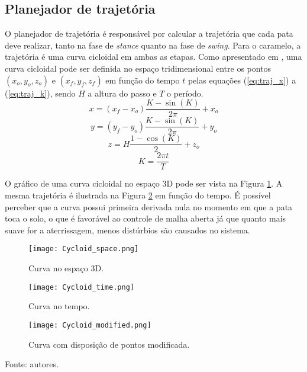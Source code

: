 \documentclass[../main.tex]{subfiles}
\begin{document}
\subsection{Planejador de trajetória}

O planejador de trajetória é responsável por calcular a trajetória que cada pata deve realizar, tanto na fase de \textit{stance} quanto na fase de \textit{swing}. Para o caramelo, a trajetória é uma curva cicloidal em ambas as etapas. Como apresentado em \cite{Shi2021}, uma curva cicloidal pode ser definida no espaço tridimensional entre os pontos $(x_o, y_o, z_o)$ e $(x_f, y_f, z_f)$ em função do tempo $t$ pelas equações (\ref{eq:traj_x}) a (\ref{eq:traj_k}), sendo $H$ a altura do passo e $T$ o período.
\begin{equation}
  x = (x_f - x_o) \frac{K - \sin{(K)}}{2 \pi} + x_o
  \label{eq:traj_x}
\end{equation}
\begin{equation}
  y = (y_f - y_o) \frac{K - \sin{(K)}}{2 \pi} + y_o
  \label{eq:traj_y}
\end{equation}
\begin{equation}
  z = H \frac{1 - \cos{(K)}}{2} + z_o
  \label{eq:traj_z}
\end{equation}
\begin{equation}
  K = \frac{2 \pi t}{T}
  \label{eq:traj_k}
\end{equation}

O gráfico de uma curva cicloidal no espaço 3D pode ser vista na Figura \ref{fig:traj_space}. A mesma trajetória é ilustrada na Figura \ref{fig:traj_time} em função do tempo. É possível perceber que a curva possui primeira derivada nula no momento em que a pata toca o solo, o que é favorável ao controle de malha aberta já que quanto mais suave for a aterrissagem, menos distúrbios são causados no sistema.
\begin{figure*}[h]
  \centering
  \caption{Trajetórias cicloidais para o passo de robô.}
  \begin{subfigure}[t]{0.32\textwidth}
    \centering
    \texttt{[image: Cycloid\_space.png]}
    \caption{Curva no espaço 3D.}
    \label{fig:traj_space}
  \end{subfigure}
  \begin{subfigure}[t]{0.32\textwidth}
    \centering
    \texttt{[image: Cycloid\_time.png]}
    \caption{Curva no tempo.}
    \label{fig:traj_time}
  \end{subfigure}
  \begin{subfigure}[t]{0.32\textwidth}
    \centering
    \texttt{[image: Cycloid\_modified.png]}
    \caption{Curva com disposição de pontos modificada.}
    \label{fig:traj_time_modified}
  \end{subfigure}
  \vfill
  Fonte: autores.
  \label{fig:traj_curve}
\end{figure*}
\end{document}

